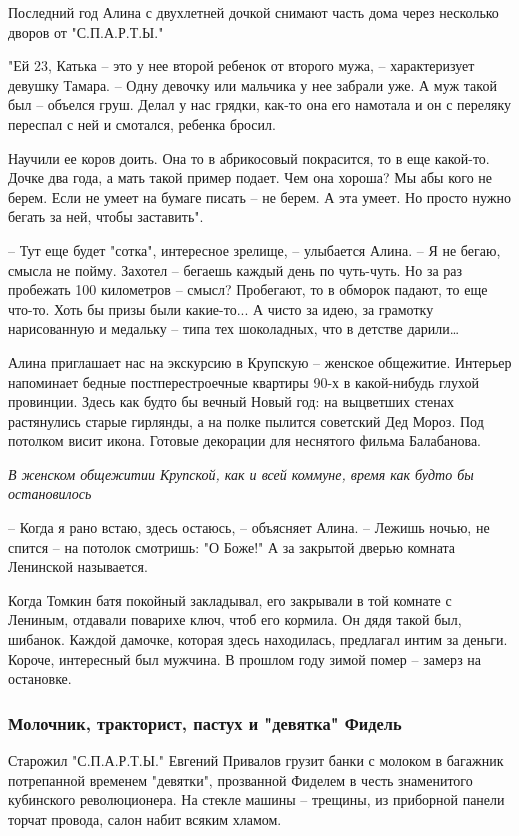 Последний год Алина с двухлетней дочкой снимают часть дома через несколько
дворов от "С.П.А.Р.Т.Ы." 

"Ей 23, Катька – это у нее второй ребенок от второго мужа, – характеризует
девушку Тамара. – Одну девочку или мальчика у нее забрали уже. А муж такой был
– объелся груш. Делал у нас грядки, как-то она его намотала и он с переляку
переспал с ней и смотался, ребенка бросил. 

Научили ее коров доить. Она то в абрикосовый покрасится, то в еще какой-то.
Дочке два года, а мать такой пример подает. Чем она хороша? Мы абы кого не
берем. Если не умеет на бумаге писать – не берем. А эта умеет. Но просто нужно
бегать за ней, чтобы заставить".

– Тут еще будет "сотка", интересное зрелище, – улыбается Алина. – Я не бегаю,
смысла не пойму. Захотел – бегаешь каждый день по чуть-чуть. Но за раз
пробежать 100 километров – смысл? Пробегают, то в обморок падают, то еще
что-то. Хоть бы призы были какие-то... А чисто за идею, за грамотку
нарисованную и медальку – типа тех шоколадных, что в детстве дарили…

Алина приглашает нас на экскурсию в Крупскую – женское общежитие. Интерьер
напоминает бедные постперестроечные квартиры 90-х в какой-нибудь глухой
провинции. Здесь как будто бы вечный Новый год: на выцветших стенах растянулись
старые гирлянды, а на полке пылится советский Дед Мороз. Под потолком висит
икона. Готовые декорации для неснятого фильма Балабанова.

\emph{В женском общежитии Крупской, как и всей коммуне, время как будто бы остановилось}

– Когда я рано встаю, здесь остаюсь, – объясняет Алина. – Лежишь ночью, не
спится – на потолок смотришь: "О Боже!" А за закрытой дверью комната Ленинской
называется. 

Когда Томкин батя покойный закладывал, его закрывали в той комнате с Лениным,
отдавали поварихе ключ, чтоб его кормила. Он дядя такой был, шибанок. Каждой
дамочке, которая здесь находилась, предлагал интим за деньги. Короче,
интересный был мужчина. В прошлом году зимой помер – замерз на остановке. 

\subsubsection{Молочник, тракторист, пастух и "девятка" Фидель}

Старожил "С.П.А.Р.Т.Ы." Евгений Привалов грузит банки с молоком в багажник
потрепанной временем "девятки", прозванной Фиделем в честь знаменитого
кубинского революционера. На стекле машины – трещины, из приборной панели
торчат провода, салон набит всяким хламом.

